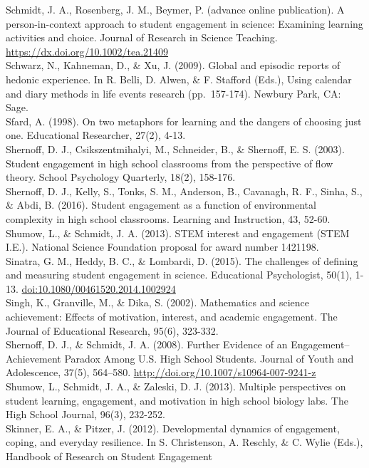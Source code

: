 \documentclass[]{msu-thesis}
\theoremstyle{definition}
\theoremstyle{definition}
\theoremstyle{definition}
\theoremstyle{remark}
\begin{document}
Schmidt, J. A., Rosenberg, J. M., Beymer, P. (advance online
publication). A person-in-context approach to student engagement in
science: Examining learning activities and choice. Journal of Research
in Science Teaching. \url{https://dx.doi.org/10.1002/tea.21409}\\
Schwarz, N., Kahneman, D., \& Xu, J. (2009). Global and episodic reports
of hedonic experience. In R. Belli, D. Alwen, \& F. Stafford (Eds.),
Using calendar and diary methods in life events research (pp.~157-174).
Newbury Park, CA: Sage.\\
Sfard, A. (1998). On two metaphors for learning and the dangers of
choosing just one. Educational Researcher, 27(2), 4-13.\\
Shernoff, D. J., Csikszentmihalyi, M., Schneider, B., \& Shernoff, E. S.
(2003). Student engagement in high school classrooms from the
perspective of flow theory. School Psychology Quarterly, 18(2),
158-176.\\
Shernoff, D. J., Kelly, S., Tonks, S. M., Anderson, B., Cavanagh, R. F.,
Sinha, S., \& Abdi, B. (2016). Student engagement as a function of
environmental complexity in high school classrooms. Learning and
Instruction, 43, 52-60.\\
Shumow, L., \& Schmidt, J. A. (2013). STEM interest and engagement (STEM
I.E.). National Science Foundation proposal for award number 1421198.\\
Sinatra, G. M., Heddy, B. C., \& Lombardi, D. (2015). The challenges of
defining and measuring student engagement in science. Educational
Psychologist, 50(1), 1-13. \url{doi:10.1080/00461520.2014.1002924}\\
Singh, K., Granville, M., \& Dika, S. (2002). Mathematics and science
achievement: Effects of motivation, interest, and academic engagement.
The Journal of Educational Research, 95(6), 323-332.\\
Shernoff, D. J., \& Schmidt, J. A. (2008). Further Evidence of an
Engagement--Achievement Paradox Among U.S. High School Students. Journal
of Youth and Adolescence, 37(5), 564--580.
\url{http://doi.org/10.1007/s10964-007-9241-z}\\
Shumow, L., Schmidt, J. A., \& Zaleski, D. J. (2013). Multiple
perspectives on student learning, engagement, and motivation in high
school biology labs. The High School Journal, 96(3), 232-252.\\
Skinner, E. A., \& Pitzer, J. (2012). Developmental dynamics of
engagement, coping, and everyday resilience. In S. Christenson, A.
Reschly, \& C. Wylie (Eds.), Handbook of Research on Student Engagement
\end{document}
